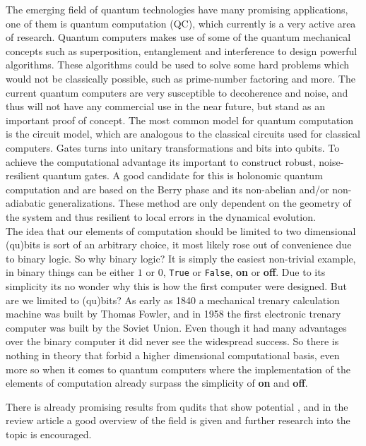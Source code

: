 The emerging field of quantum technologies have many promising applications, one of them is quantum computation (QC), which currently is a very active area of research. Quantum computers makes use of some of the quantum mechanical concepts such as superposition, entanglement and interference to design powerful algorithms. These algorithms could be used to solve some hard problems which would not be classically possible, such as prime-number factoring\cite{shor} and more\cite{Grover}. The current quantum computers are very susceptible to decoherence and noise, and thus will not have any commercial use in the near future, but stand as an important proof of concept. 
The most common model for quantum computation is the circuit model, which are analogous to the classical circuits used for classical computers. Gates turns into unitary transformations and bits into qubits. To achieve the computational advantage its important to construct robust, noise-resilient quantum gates. A good candidate for this is holonomic quantum computation\cite{HQC}\cite{NHQC} and are based on the Berry phase\cite{berry} and its non-abelian and/or non-adiabatic generalizations\cite{anandan1}\cite{anandan2}\cite{zee}. These method are only dependent on the geometry of the system and thus resilient to local errors in the dynamical evolution.
\\
The idea that our elements of computation should be limited to two dimensional (qu)bits is sort of an arbitrary choice, it most likely rose out of convenience due to binary logic. So why binary logic? It is simply the easiest non-trivial example, in binary things can be either $1$ or $0$, {\tt True} or {\tt False}, \textbf{on} or \textbf{off}. Due to its simplicity its no wonder why this is how the first computer were designed. But are we limited to (qu)bits? As early as 1840 a mechanical trenary calculation machine was built by Thomas Fowler\cite{tricalc}, and in 1958 the first electronic trenary computer was built by the Soviet Union\cite{setun}. Even though it had many advantages over the binary computer it did never see the widespread success. So there is nothing in theory that forbid a higher dimensional computational basis, even more so when it comes to quantum computers where the implementation of the elements of computation already surpass the simplicity of \textbf{on} and \textbf{off}. 

There is already promising results from qudits that show potential \cite{qutrit1}\cite{qudit2}\cite{qudit3}, and in the review article \cite{qudit} a good overview of the field is given and further research into the topic is encouraged.

